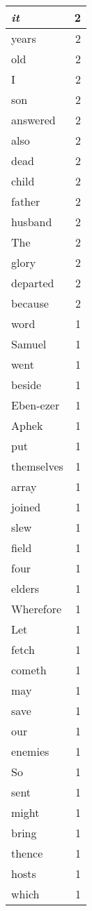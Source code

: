 \begin{center}
\begin{longtable}{l|r}
\emph{it} & 2 \\ \hline
years & 2 \\ \hline
old & 2 \\ \hline
I & 2 \\ \hline
son & 2 \\ \hline
answered & 2 \\ \hline
also & 2 \\ \hline
dead & 2 \\ \hline
child & 2 \\ \hline
father & 2 \\ \hline
husband & 2 \\ \hline
The & 2 \\ \hline
glory & 2 \\ \hline
departed & 2 \\ \hline
because & 2 \\ \hline
word & 1 \\ \hline
Samuel & 1 \\ \hline
went & 1 \\ \hline
beside & 1 \\ \hline
Eben-ezer & 1 \\ \hline
Aphek & 1 \\ \hline
put & 1 \\ \hline
themselves & 1 \\ \hline
array & 1 \\ \hline
joined & 1 \\ \hline
slew & 1 \\ \hline
field & 1 \\ \hline
four & 1 \\ \hline
elders & 1 \\ \hline
Wherefore & 1 \\ \hline
Let & 1 \\ \hline
fetch & 1 \\ \hline
cometh & 1 \\ \hline
may & 1 \\ \hline
save & 1 \\ \hline
our & 1 \\ \hline
enemies & 1 \\ \hline
So & 1 \\ \hline
sent & 1 \\ \hline
might & 1 \\ \hline
bring & 1 \\ \hline
thence & 1 \\ \hline
hosts & 1 \\ \hline
which & 1 \\ \hline

\end{longtable}
\end{center}
